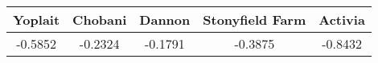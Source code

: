 \begin{tabular}{ccccc}
\hline
Yoplait & Chobani & Dannon & Stonyfield Farm & Activia \\
\hline
-0.5852 & -0.2324 & -0.1791 & -0.3875 & -0.8432 \\
\hline
\end{tabular}